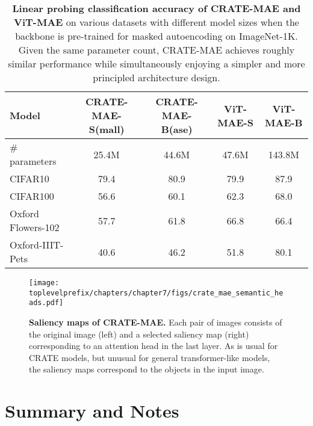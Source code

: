 \documentclass[../../book-main.tex]{subfiles}
\begin{document}
\begin{table}
    \centering 
    \begin{tabular}{@{}lcc|cc@{}}
        \toprule 
        \textbf{Model} & CRATE-MAE-S(mall) & CRATE-MAE-B(ase) & {\color{gray} ViT-MAE-S} & {\color{gray} ViT-MAE-B} \\
        \midrule
        \midrule
        \# parameters & 25.4M & 44.6M & 47.6M & {\color{gray}143.8M} \\
        \midrule
        CIFAR10 & 79.4 & 80.9 & {\color{gray} 79.9} & {\color{gray} 87.9} \\
        CIFAR100 & 56.6 & 60.1 & {\color{gray} 62.3} & {\color{gray} 68.0} \\
        Oxford Flowers-102 & 57.7 & 61.8 & {\color{gray} 66.8} & {\color{gray} 66.4} \\
        Oxford-IIIT-Pets & 40.6 & 46.2 & {\color{gray} 51.8} & {\color{gray} 80.1} \\
        \bottomrule
    \end{tabular}
    \caption{\small\textbf{Linear probing classification accuracy of CRATE-MAE and ViT-MAE} on various datasets with different model sizes when the backbone is pre-trained for masked autoencoding on ImageNet-1K. Given the same parameter count, CRATE-MAE achieves roughly similar performance while simultaneously enjoying a simpler and more principled architecture design.}
    \label{tab:crate_mae_linear_probing}
\end{table}

\begin{figure}
    \centering 
    \texttt{[image: \\toplevelprefix/chapters/chapter7/figs/crate\_mae\_semantic\_heads.pdf]}
    \caption{\small\textbf{Saliency maps of CRATE-MAE.} Each pair of images consists of the original image (left) and a selected saliency map (right) corresponding to an attention head in the last layer. As is usual for CRATE models, but unusual for general transformer-like models, the saliency maps correspond to the objects in the input image.}
    \label{fig:crate_mae_semantic_heads}
\end{figure}





\section{Summary and Notes}
\end{document}
